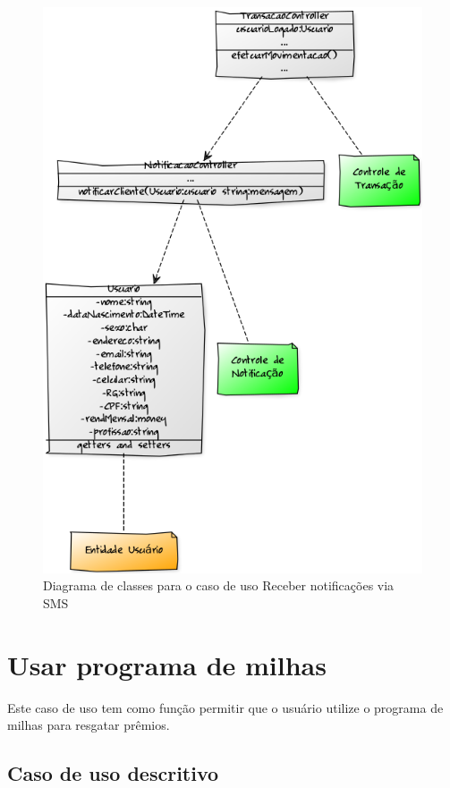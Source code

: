 \begin{figure}[!htb]
     \centering
     \includegraphics[scale=0.5]{diagramas/diagrama-de-classe/imagens/notificacao.png}
     \caption{Diagrama de classes para o caso de uso Receber notificações via SMS}
     \label{ddc:notificacao}
\end{figure}

\section{Usar programa de milhas}

Este caso de uso tem como função permitir que o usuário utilize o programa de milhas para resgatar prêmios.

\subsection{Caso de uso descritivo}

